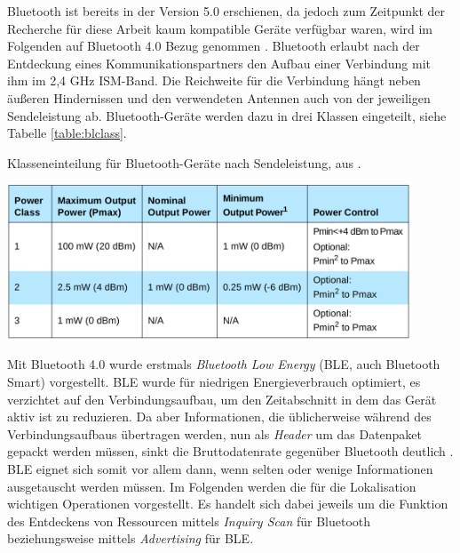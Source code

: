 Bluetooth ist bereits in der Version 5.0 erschienen, da jedoch zum Zeitpunkt der Recherche für diese Arbeit kaum kompatible Geräte verfügbar waren, wird im Folgenden auf Bluetooth 4.0 Bezug genommen \cite{blue2010spec}.
Bluetooth erlaubt nach der Entdeckung eines Kommunikationspartners den Aufbau einer Verbindung mit ihm im 2,4 GHz ISM-Band.
Die Reichweite für die Verbindung hängt neben äußeren Hindernissen und den verwendeten Antennen auch von der jeweiligen Sendeleistung ab.
Bluetooth-Geräte werden dazu in drei Klassen eingeteilt, siehe Tabelle \ref{table:blclass}.

\begin{table}[h]
  \centering
	\caption{Klasseneinteilung für Bluetooth-Geräte nach Sendeleistung, aus \cite{blue2010classes}.}
	\includegraphics[width=0.9\textwidth]{images/blueclasses.png}
  \label{table:blclass}
\end{table}

Mit Bluetooth 4.0 wurde erstmals \emph{Bluetooth Low Energy} (BLE, auch Bluetooth Smart) vorgestellt.
BLE wurde für niedrigen Energieverbrauch optimiert, es verzichtet auf den Verbindungsaufbau, um den Zeitabschnitt in dem das Gerät aktiv ist zu reduzieren.
Da aber Informationen, die üblicherweise während des Verbindungsaufbaus übertragen werden, nun als \emph{Header} um das Datenpaket gepackt werden müssen, sinkt die Bruttodatenrate gegenüber Bluetooth deutlich \cite{rigado2016practical}. 
BLE eignet sich somit vor allem dann, wenn selten oder wenige Informationen ausgetauscht werden müssen.
Im Folgenden werden die für die Lokalisation wichtigen Operationen vorgestellt.
Es handelt sich dabei jeweils um die Funktion des Entdeckens von Ressourcen mittels \emph{Inquiry Scan} für Bluetooth beziehungsweise mittels \emph{Advertising} für BLE.

